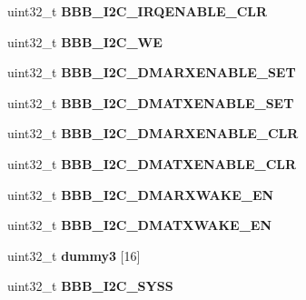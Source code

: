\begin{DoxyCompactItemize}
uint32\+\_\+t {\bfseries B\+B\+B\+\_\+\+I2\+C\+\_\+\+I\+R\+Q\+E\+N\+A\+B\+L\+E\+\_\+\+C\+LR}
\item 
\mbox{\label{structi2c__regs_a1384a5a32cee069a3f496f57bb16d29c}} 
uint32\+\_\+t {\bfseries B\+B\+B\+\_\+\+I2\+C\+\_\+\+WE}
\item 
\mbox{\label{structi2c__regs_a85c8437fd0e65f261d4999632f6e549c}} 
uint32\+\_\+t {\bfseries B\+B\+B\+\_\+\+I2\+C\+\_\+\+D\+M\+A\+R\+X\+E\+N\+A\+B\+L\+E\+\_\+\+S\+ET}
\item 
\mbox{\label{structi2c__regs_a0222bf42761d4f12d003bdee7a4d5ce7}} 
uint32\+\_\+t {\bfseries B\+B\+B\+\_\+\+I2\+C\+\_\+\+D\+M\+A\+T\+X\+E\+N\+A\+B\+L\+E\+\_\+\+S\+ET}
\item 
\mbox{\label{structi2c__regs_a05a095f43ec5c319bff13a9ea8ba0ac7}} 
uint32\+\_\+t {\bfseries B\+B\+B\+\_\+\+I2\+C\+\_\+\+D\+M\+A\+R\+X\+E\+N\+A\+B\+L\+E\+\_\+\+C\+LR}
\item 
\mbox{\label{structi2c__regs_ac50f95c65d124d4b46550b4367af6d2f}} 
uint32\+\_\+t {\bfseries B\+B\+B\+\_\+\+I2\+C\+\_\+\+D\+M\+A\+T\+X\+E\+N\+A\+B\+L\+E\+\_\+\+C\+LR}
\item 
\mbox{\label{structi2c__regs_aaee861e654ecbac206ab03b9737417e7}} 
uint32\+\_\+t {\bfseries B\+B\+B\+\_\+\+I2\+C\+\_\+\+D\+M\+A\+R\+X\+W\+A\+K\+E\+\_\+\+EN}
\item 
\mbox{\label{structi2c__regs_a5abe154a167b0dce4e52b5dd3cb325d0}} 
uint32\+\_\+t {\bfseries B\+B\+B\+\_\+\+I2\+C\+\_\+\+D\+M\+A\+T\+X\+W\+A\+K\+E\+\_\+\+EN}
\item 
\mbox{\label{structi2c__regs_a017d2b5b0d0e0565e284ddfe000f1209}} 
uint32\+\_\+t {\bfseries dummy3} \mbox{[}16\mbox{]}
\item 
\mbox{\label{structi2c__regs_a036f8885d925f5f163dbda23e9d08b09}} 
uint32\+\_\+t {\bfseries B\+B\+B\+\_\+\+I2\+C\+\_\+\+S\+Y\+SS}
\item 
\mbox{\label{structi2c__regs_a2d82812df7d626e6d773cb61b1aa0e41}} 

\end{DoxyCompactItemize}
